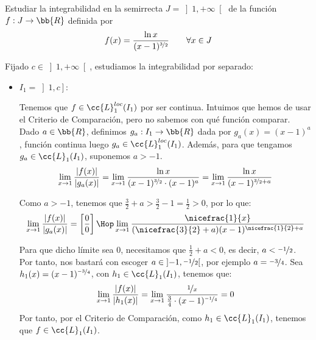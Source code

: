 \begin{ejercicio} Estudiar la integrabilidad
    en la semirrecta $J=\left]1,+\infty\right[$ de la función $f:J\to \bb{R}$ definida por
    \begin{equation*}
        f(x) = \frac{\ln x}{(x-1)^{\nicefrac{3}{2}}}       \qquad \forall x\in J
    \end{equation*}


    Fijado $c\in \left]1,+\infty\right[$, estudiamos la integrabilidad por separado:
    \begin{itemize}
        \item \underline{$I_1 = \left]1, c\right]$}:
        
            Tenemos que $f\in \cc{L}_1^{loc}(I_1)$ por ser continua. Intuimos que hemos de usar el Criterio de Comparación, pero no sabemos con qué función comparar.
            Dado $a\in \bb{R}$,
            definimos $g_a:I_1\to \bb{R}$ dada por $g_a(x)=(x-1)^{a}$, función continua luego $g_a\in \cc{L}_1^{loc}(I_1)$.
            Además, para que tengamos $g_a\in \cc{L}_1(I_1)$, suponemos $a>-1$.
            \begin{equation*}
                \lim_{x\to 1} \dfrac{|f(x)|}{|g_a(x)|} = \lim_{x\to 1} \dfrac{\ln x}{(x-1)^{\nicefrac{3}{2}}\cdot (x-1)^{a}}
                = \lim_{x\to 1} \dfrac{\ln x}{(x-1)^{\nicefrac{3}{2}+a}}
            \end{equation*}

            Como $a>-1$, tenemos que $\frac{3}{2}+a>\frac{3}{2}-1=\frac{1}{2}>0$, por lo que:
            \begin{equation*}
                \lim_{x\to 1} \dfrac{|f(x)|}{|g_a(x)|} = \left[\dfrac{0}{0}\right]
                \Hop
                \lim_{x\to 1} \dfrac{\nicefrac{1}{x}}{(\nicefrac{3}{2}+a)(x-1)^{\nicefrac{1}{2}+a}}
            \end{equation*}

            Para que dicho límite sea $0$, necesitamos que $\frac{1}{2}+a<0$, es decir, $a<\nicefrac{-1}{2}$.
            Por tanto, nos bastará con escoger $a\in \left]-1, \nicefrac{-1}{2}\right[$, por ejemplo $a=\nicefrac{-3}{4}$. Sea $h_1(x)=(x-1)^{\nicefrac{-3}{4}}$, con $h_1\in \cc{L}_1(I_1)$, tenemos que:
            \begin{equation*}
                \lim_{x\to 1} \dfrac{|f(x)|}{|h_1(x)|}
                =\lim_{x\to 1} \dfrac{\nicefrac{1}{x}}{\frac{3}{4}\cdot (x-1)^{\nicefrac{-1}{4}}} = 0
            \end{equation*}
            Por tanto, por el Criterio de Comparación, como $h_1\in \cc{L}_1(I_1)$, tenemos que $f\in \cc{L}_1(I_1)$.


\end{itemize}
\end{ejercicio}
